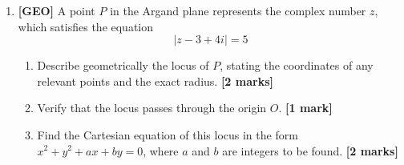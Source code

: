 \documentclass[11pt,a4paper]{article}
\begin{document}
\begin{enumerate}
\item \textbf{[GEO]} A point $P$ in the Argand plane represents the complex number $z$, which satisfies the equation
\[
|z - 3 + 4i| = 5
\]
\begin{enumerate}[label=(\alph*)]
  \item Describe geometrically the locus of $P$, stating the coordinates of any relevant points and the exact radius. \hfill{\textbf{[2 marks]}}
  \item Verify that the locus passes through the origin $O$. \hfill{\textbf{[1 mark]}}
  \item Find the Cartesian equation of this locus in the form $x^2 + y^2 + ax + by = 0$, where $a$ and $b$ are integers to be found. \hfill{\textbf{[2 marks]}}
\end{enumerate}

\end{enumerate}
\end{document}
